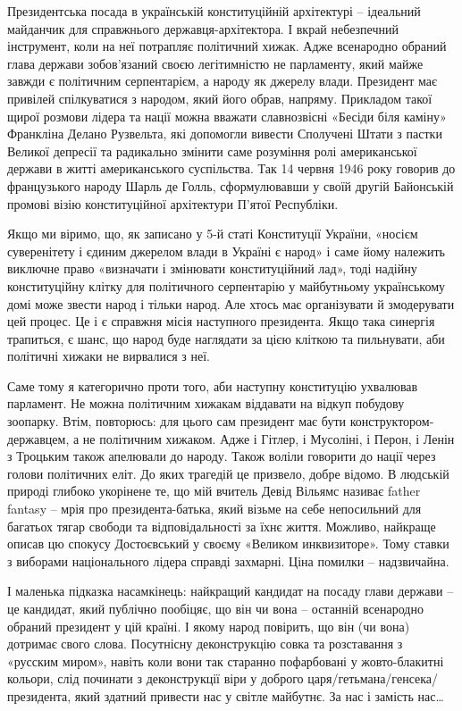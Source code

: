 Президентська посада в українській конституційній архітектурі – ідеальний
майданчик для справжнього державця-архітектора. І вкрай небезпечний інструмент,
коли на неї потрапляє політичний хижак. Адже всенародно обраний глава держави
зобов’язаний своєю легітимністю не парламенту, який майже завжди є політичним
серпентарієм, а народу як джерелу влади. Президент має привілей спілкуватися з
народом, який його обрав, напряму. Прикладом такої щирої розмови лідера та
нації можна вважати славнозвісні «Бесіди біля каміну» Франкліна Делано
Рузвельта, які допомогли вивести Сполучені Штати з пастки Великої депресії та
радикально змінити саме розуміння ролі американської держави в житті
американського суспільства. Так 14 червня 1946 року говорив до французького
народу Шарль де Голль, сформулювавши у своїй другій Байонській промові візію
конституційної архітектури П’ятої Республіки.

Якщо ми віримо, що, як записано у 5-й статі Конституції України, «носієм
суверенітету і єдиним джерелом влади в Україні є народ» і саме йому належить
виключне право «визначати і змінювати конституційний лад», тоді надійну
конституційну клітку для політичного серпентарію у майбутньому українському
домі може звести народ і тільки народ. Але хтось має організувати й змодерувати
цей процес. Це і є справжня місія наступного президента. Якщо така синергія
трапиться, є шанс, що народ буде наглядати за цією кліткою та пильнувати, аби
політичні хижаки не вирвалися з неї.

Саме тому я категорично проти того, аби наступну конституцію ухвалював
парламент. Не можна політичним хижакам віддавати на відкуп побудову зоопарку.
Втім, повторюсь: для цього сам президент має бути конструктором-державцем, а не
політичним хижаком. Адже і Гітлер, і Мусоліні, і Перон, і Ленін з Троцьким
також апелювали до народу. Також воліли говорити до нації через голови
політичних еліт. До яких трагедій це призвело, добре відомо. В людській природі
глибоко укорінене те, що мій вчитель Девід Вільямс називає father fantasy –
мрія про президента-батька, який візьме на себе непосильний для багатьох тягар
свободи та відповідальності за їхнє життя. Можливо, найкраще описав цю спокусу
Достоєвський у своєму «Великом инквизиторе». Тому ставки з виборами
національного лідера справді захмарні. Ціна помилки – надзвичайна.

І маленька підказка насамкінець: найкращий кандидат на посаду глави держави –
це кандидат, який публічно пообіцяє, що він чи вона – останній всенародно
обраний президент у цій країні. І якому народ повірить, що він (чи вона)
дотримає свого слова. Посутнісну деконструкцію совка та розставання з «русским
миром», навіть коли вони так старанно пофарбовані у жовто-блакитні кольори,
слід починати з деконструкції віри у доброго царя/гетьмана/генсека/президента,
який здатний привести нас у світле майбутнє. За нас і замість нас…
